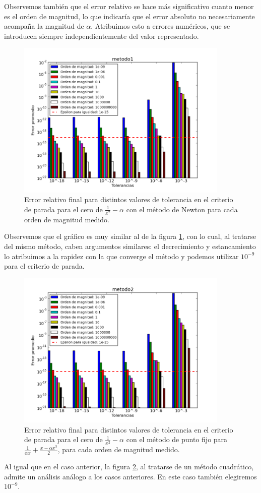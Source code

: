 Observemos también que el error relativo se hace más significativo cuanto menor es el orden de magnitud, lo que indicaría que el error absoluto no necesariamente acompaña la magnitud de $\alpha$. Atribuimos esto a errores numéricos, que se introducen siempre independientemente del valor representado.


\begin{figure}[H]
  \centering
    \includegraphics[width=0.9\textwidth]{../data/metodo1.png}
    \caption{Error relativo final para distintos valores de tolerancia en el criterio de parada para el cero de $\frac{1}{x^2} - \alpha$ con el método de Newton para cada orden de magnitud medido.}
    \label{paradaMet1}
\end{figure}

Observemos que el gráfico es muy similar al de la figura \ref{paradaMet1}, con lo cual, al tratarse del mismo método, caben argumentos similares: el decrecimiento y estancamiento lo atribuimos a la rapidez con la que converge el método y podemos utilizar $10^{-9}$ para el criterio de parada.

\begin{figure}[H]
  \centering
    \includegraphics[width=0.9\textwidth]{../data/metodo2.png}
    \caption{Error relativo final para distintos valores de tolerancia en el criterio de parada para el cero de $\frac{1}{x^2} - \alpha$ con el método de punto fijo para $\frac{1}{\alpha x} + \frac{x - \alpha x^3}{2}$, para cada orden de magnitud medido.}
    \label{paradaMet2}
\end{figure}

Al igual que en el caso anterior, la figura \ref{paradaMet2}, al tratarse de un método cuadrático, admite un análisis análogo a los casos anteriores. En este caso también elegiremos $10^{-9}$.
